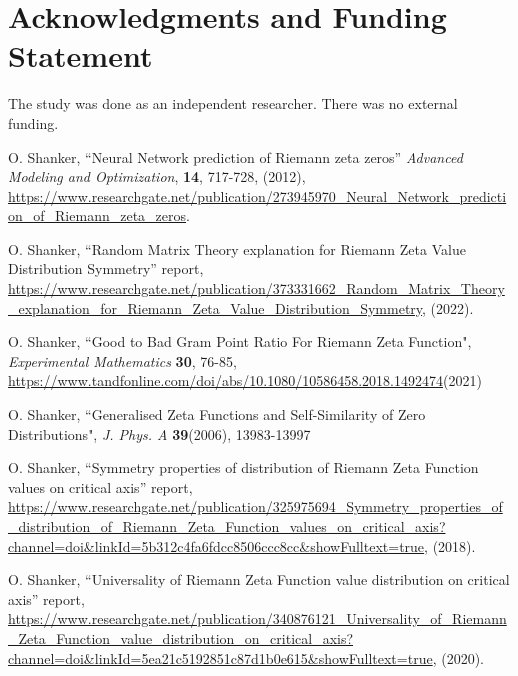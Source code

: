 \documentclass[twoside]{article}
\begin{document}
\section*{Acknowledgments and Funding Statement}

 The study was done as an independent researcher. There was no
external funding.




\begin{thebibliography}{10}

 O. Shanker, ``Neural Network prediction of Riemann zeta zeros''
{\it Advanced Modeling and Optimization}, {\bf 14}, 717-728, (2012), \url{https://www.researchgate.net/publication/273945970_Neural_Network_prediction_of_Riemann_zeta_zeros}.


 O. Shanker, 
``Random Matrix Theory explanation for Riemann Zeta Value Distribution Symmetry''
 report,
\url{https://www.researchgate.net/publication/373331662_Random_Matrix_Theory_explanation_for_Riemann_Zeta_Value_Distribution_Symmetry}, 
(2022). 


 O. Shanker, 
``Good to Bad Gram Point Ratio For Riemann Zeta Function",
{\it Experimental Mathematics} {\bf 30}, 76-85,
\url{https://www.tandfonline.com/doi/abs/10.1080/10586458.2018.1492474}(2021)

 O. Shanker, 
``Generalised Zeta Functions and Self-Similarity of Zero Distributions",
{\it J.  Phys. A} {\bf39}(2006), 13983-13997

 O. Shanker, 
``Symmetry properties of distribution of Riemann Zeta Function values on critical axis''
 report,
\url{https://www.researchgate.net/publication/325975694_Symmetry_properties_of_distribution_of_Riemann_Zeta_Function_values_on_critical_axis?channel=doi&linkId=5b312c4fa6fdcc8506ccc8cc&showFulltext=true}, 
(2018). 

 O. Shanker, 
``Universality of Riemann Zeta Function value distribution on critical axis''
 report,
\url{https://www.researchgate.net/publication/340876121_Universality_of_Riemann_Zeta_Function_value_distribution_on_critical_axis?channel=doi&linkId=5ea21c5192851c87d1b0e615&showFulltext=true}, 
(2020). 




\end{thebibliography} 
\end{document}
